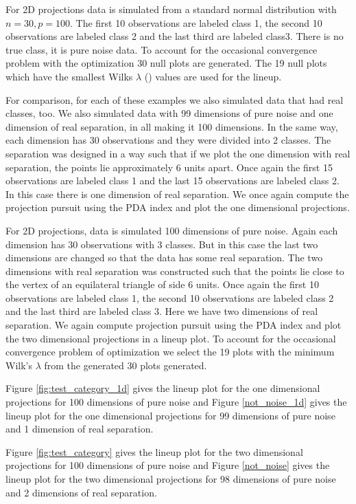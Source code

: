 \documentclass[12]{report}
\begin{document}
For 2D projections data is simulated from a standard normal distribution with $n=30, p=100$. The first 10 observations are labeled class 1, the second 10 observations are labeled class 2 and the last third are labeled class3. There is no true class, it is pure noise data. To account for the occasional convergence problem with the optimization 30 null plots are generated. The 19 null plots which have the smallest Wilks $\lambda$ (\cite{JW02}) values are used for the lineup. 

For comparison, for each of these examples we also simulated data that had real classes, too. We also simulated data with 99 dimensions of pure noise and one dimension of real separation, in all making it 100 dimensions. In the same way, each dimension has 30 observations and they were divided into 2 classes. The separation was designed in a way such that if we plot the one dimension with real separation, the points lie approximately 6 units apart. Once again the first 15 observations are labeled class 1 and the last 15 observations are labeled class 2. In this case there is one dimension of real separation. We once again compute the projection pursuit using the PDA index and plot the one dimensional projections.

For 2D projections, data is simulated 100 dimensions of pure noise. Again each dimension has 30 observations with 3 classes. But in this case the last two dimensions are changed so that the data has some real separation. The two dimensions with real separation was constructed such that the points lie close to the vertex of an equilateral triangle of side 6 units. Once again the first 10 observations are labeled class 1, the second 10 observations are labeled class 2 and the last third are labeled class 3. Here we have two dimensions of real separation. We again compute projection pursuit using the PDA index and plot the two dimensional projections in a lineup plot.  To account for the occasional convergence problem of optimization we select the 19 plots with the minimum Wilk's $\lambda$ from the generated 30 plots generated.

Figure \ref{fig:test_category_1d} gives the lineup plot for the one dimensional projections for 100 dimensions of pure noise and Figure \ref{not_noise_1d} gives the lineup plot for the one dimensional projections for 99 dimensions of pure noise and 1 dimension of real separation.

Figure \ref{fig:test_category} gives the lineup plot for the two dimensional projections for 100 dimensions of pure noise and Figure \ref{not_noise} gives the lineup plot for the two dimensional projections for 98 dimensions of pure noise and 2 dimensions of real separation.
\end{document}
